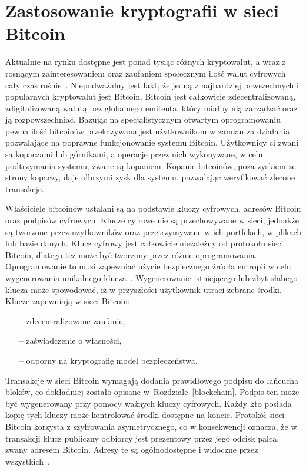 \documentclass[12pt, oneside, final, openany]{mgr}
\begin{document}
\section{Zastosowanie kryptografii w sieci Bitcoin} \label{sec:zastosowanieKryptografii}
\indent Aktualnie na rynku dostępne jest ponad tysiąc różnych kryptowalut, a wraz z rosnącym zainteresowaniem oraz zaufaniem społecznym ilość walut cyfrowych cały czas rośnie~\cite{Zcoinmarketcap, TheAgeOfCryptocurrency}. Niepodważalny jest fakt, że jedną z najbardziej powszechnych i popularnych kryptowalut jest Bitcoin. Bitcoin jest całkowicie zdecentralizowaną, zdigitalizowaną walutą bez globalnego emitenta, który miałby nią zarządzać oraz ją rozpowszechniać. Bazując na specjalistycznym otwartym oprogramowaniu pewna ilość bitcoinów przekazywana jest użytkownikom w zamian za działania pozwalające na poprawne funkcjonowanie systemu Bitcoin. Użytkownicy ci zwani są kopaczami lub górnikami, a operacje przez nich wykonywane, w celu podtrzymania systemu, zwane są kopaniem. Kopanie bitcoinów, poza zyskiem ze strony kopaczy, daje olbrzymi zysk dla systemu, pozwalając weryfikować zlecone transakcje.

\indent Właściciele bitcoinów ustalani są na podstawie kluczy cyfrowych, adresów Bitcoin oraz podpisów cyfrowych. Klucze cyfrowe nie są przechowywane w sieci, jednakże są tworzone przez użytkowników oraz przetrzymywane w ich portfelach, w plikach lub bazie danych. Klucz cyfrowy jest całkowicie niezależny od protokołu sieci Bitcoin, dlatego też może być tworzony przez różnie oprogramowania. Oprogramowanie to musi zapewniać użycie bezpiecznego źródła entropii w celu wygenerowania unikalnego klucza~\cite{Mastering, asychPrivateKey}. Wygenerowanie istniejącego lub zbyt słabego klucza może spowodować, iż w przyszłości użytkownik utraci zebrane środki. Klucze zapewniają w sieci Bitcoin:
\begin{itemize}
\item[--] zdecentralizowane zaufanie,
\item[--] zaświadczenie o własności,
\item[--] odporny na kryptografię model bezpieczeństwa.
\end{itemize}
Transakcje w sieci Bitcoin wymagają dodania prawidłowego podpisu do łańcucha bloków, co dokładniej zostało opisane w~Rozdziale~\ref{blockchain}. Podpis ten może być wygenerowany przy pomocy ważnych kluczy cyfrowych. Każdy kto posiada kopię tych kluczy może kontrolować środki dostępne na koncie. Protokół sieci Bitcoin korzysta z szyfrowania asymetrycznego, co w konsekwencji oznacza, że w transakcji klucz publiczny odbiorcy jest prezentowy przez jego odcisk palca, zwany adresem Bitcoin. Adresy te są ogólnodostępne i widoczne przez wszystkich~\cite{blockchaininfo}. 
\end{document}
